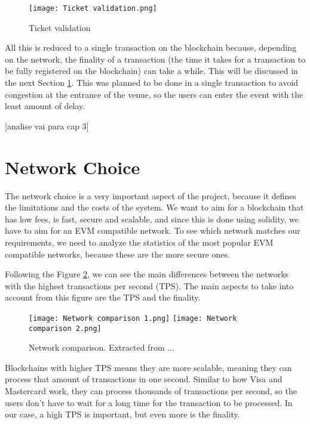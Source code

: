 \begin{figure}[H]
	\texttt{[image: Ticket validation.png]}
	\centering
	\caption{Ticket validation}
	\label{fig:ticket_validation}
\end{figure}

All this is reduced to a single transaction on the blockchain because,
depending on the network, the finality of a transaction (the time it takes for
a transaction to be fully registered on the blockchain) can take a while. This
will be discussed in the next Section \ref{sec:network_choice}. This was
planned to be done in a single transaction to avoid congestion at the entrance
of the venue, so the users can enter the event with the least amount of delay.

	[analise vai para cap 3]

\section{Network Choice}
\label{sec:network_choice}

The network choice is a very important aspect of the project, because it
defines the limitations and the costs of the system. We want to aim for a
blockchain that has low fees, is fast, secure and scalable, and since this is
done using solidity, we have to aim for an EVM compatible network. To see which
network matches our requirements, we need to analyze the statistics of the most
popular EVM compatible networks, because these are the more secure ones.

Following the Figure \ref{fig:network_comparison}, we can see the main
differences between the networks with the highest transactions per second
(TPS). The main aspects to take into account from this figure are the TPS and
the finality.

\begin{figure}[H]
	\texttt{[image: Network comparison 1.png]}
	\texttt{[image: Network comparison 2.png]}
	\centering
	\caption{Network comparison. Extracted from ...}
	\label{fig:network_comparison}
\end{figure}

Blockchains with higher TPS means they are more scalable, meaning they can
process that amount of transactions in one second. Similar to how Visa and
Mastercard work, they can process thousands of transactions per second, so the
users don't have to wait for a long time for the transaction to be processed.
In our case, a high TPS is important, but even more is the finality.

